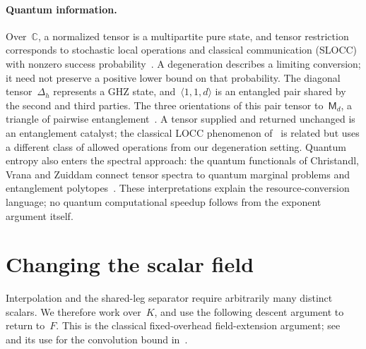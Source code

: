\documentclass[11pt,letterpaper]{article}
\theoremstyle{definition}
\numberwithin{equation}{section}
\newcommand{\MM}{\mathsf M}
\begin{document}
\paragraph{Quantum information.}
Over~$\mathbb C$, a normalized tensor is a multipartite pure state, and tensor restriction corresponds to stochastic local operations and classical communication (SLOCC) with nonzero success probability~\cite{VC15}. A degeneration describes a limiting conversion; it need not preserve a positive lower bound on that probability. The diagonal tensor~$\Delta_h$ represents a GHZ state, and~$\langle1,1,d\rangle$ is an entangled pair shared by the second and third parties. The three orientations of this pair tensor to~$\MM_d$, a triangle of pairwise entanglement~\cite{CZ19,Christandl24}. A tensor supplied and returned unchanged is an entanglement catalyst; the classical LOCC phenomenon of~\cite{JP99} is related but uses a different class of allowed operations from our degeneration setting. Quantum entropy also enters the spectral approach: the quantum functionals of Christandl, Vrana and Zuiddam connect tensor spectra to quantum marginal problems and entanglement polytopes~\cite{CVZ}. These interpretations explain the resource-conversion language; no quantum computational speedup follows from the exponent argument itself.


\appendix
\section{Changing the scalar field}
\label{sec:descent}


Interpolation and the shared-leg separator require arbitrarily many distinct scalars. We therefore work over~$K$, and use the following descent argument to return to~$F$. This is the classical fixed-overhead field-extension argument; see~\cite[Theorems 2.7--2.8]{Sch81} and its use for the convolution bound in~\cite{Navot26}.
\end{document}
